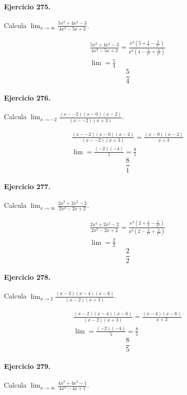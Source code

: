 \documentclass[11pt,a4paper]{article}
\begin{document}
\paragraph{Ejercicio 275.} Calcula $\displaystyle\lim_{x\to\infty}\frac{5x^3+4x^2-3}{4x^3-5x+3}$. 

\[
\begin{aligned}
\frac{5x^3+4x^2-3}{4x^3-5x+3}=\frac{x^3(5+\frac{4}{x}-\frac{3}{x^3})}{x^3(4-\frac{5}{x^2}+\frac{3}{x^3})}\\
\lim=\frac{5}{4}
\end{aligned}
\]
\[\boxed{\frac{5}{4}}\]


\paragraph{Ejercicio 276.} Calcula $\displaystyle\lim_{x\to -2}\frac{(x--2)(x-0)(x-2)}{(x--2)(x+3)}$. 

\[
\begin{aligned}
\frac{(x--2)(x-0)(x-2)}{(x--2)(x+3)}=\frac{(x-0)(x-2)}{x+3}\\
\lim=\frac{(-2)(-4)}{1}=\frac{8}{1}
\end{aligned}
\]
\[\boxed{\frac{8}{1}}\]


\paragraph{Ejercicio 277.} Calcula $\displaystyle\lim_{x\to\infty}\frac{2x^3+2x^2-2}{2x^3-2x+2}$. 

\[
\begin{aligned}
\frac{2x^3+2x^2-2}{2x^3-2x+2}=\frac{x^3(2+\frac{2}{x}-\frac{2}{x^3})}{x^3(2-\frac{2}{x^2}+\frac{2}{x^3})}\\
\lim=\frac{2}{2}
\end{aligned}
\]
\[\boxed{\frac{2}{2}}\]


\paragraph{Ejercicio 278.} Calcula $\displaystyle\lim_{x\to 2}\frac{(x-2)(x-4)(x-6)}{(x-2)(x+3)}$. 

\[
\begin{aligned}
\frac{(x-2)(x-4)(x-6)}{(x-2)(x+3)}=\frac{(x-4)(x-6)}{x+3}\\
\lim=\frac{(-2)(-4)}{5}=\frac{8}{5}
\end{aligned}
\]
\[\boxed{\frac{8}{5}}\]


\paragraph{Ejercicio 279.} Calcula $\displaystyle\lim_{x\to\infty}\frac{4x^3+4x^2-1}{4x^3-4x+1}$. 
\end{document}
